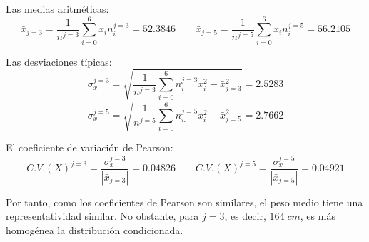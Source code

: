 \begin{ejercicio}
\begin{enumerate}
        Las medias aritméticas:
        \begin{equation*}
            \bar{x}_{j=3} = \frac{1}{n^{j=3}}\sum_{i=0}^6 x_in_{i.}^{j=3} = 52.3846
            \qquad
            \bar{x}_{j=5} = \frac{1}{n^{j=5}}\sum_{i=0}^6 x_in_{i.}^{j=5} = 56.2105
        \end{equation*}

        Las desviaciones típicas:
        \begin{equation*}
            \sigma_x^{j=3} = \sqrt{\frac{1}{n^{j=3}}\sum_{i=0}^6 n_{i.}^{j=3} x_i^2 - \bar{x}_{j=3}^2} = 2.5283
        \end{equation*}
        \begin{equation*}
            \sigma_x^{j=5} = \sqrt{\frac{1}{n^{j=5}}\sum_{i=0}^6 n_{i.}^{j=5} x_i^2 - \bar{x}_{j=5}^2} = 2.7662
        \end{equation*}

        El coeficiente de variación de Pearson:
        \begin{equation*}
            C.V.(X)^{j=3} = \frac{\sigma_x^{j=3}}{|\bar{x}_{j=3}|} = 0.04826
            \qquad
            C.V.(X)^{j=5} = \frac{\sigma_x^{j=5}}{|\bar{x}_{j=5}|} = 0.04921
        \end{equation*}

        Por tanto, como los coeficientes de Pearson son similares, el peso medio tiene una representatividad similar. No obstante, para $j=3$, es decir, $164\;cm$, es más homogénea la distribución condicionada.
    \end{enumerate}
\end{ejercicio}

